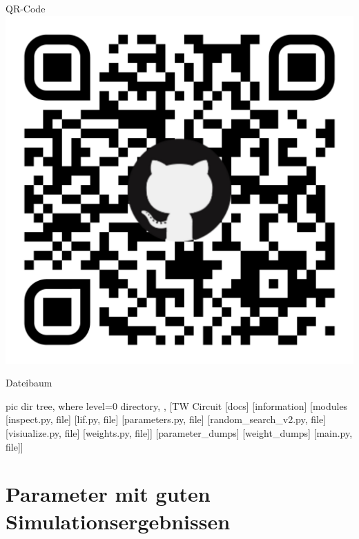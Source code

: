 \begin{minipage}[b]{0.38\textwidth}
	\begin{mybox}{QR-Code}
		\includegraphics[width=\textwidth]{figures/appendix/qr-code.pdf}
	\end{mybox}
	\begin{mybox}{Dateibaum}
		\vspace{0.3cm}
		\begin{forest}
			pic dir tree,
			where level=0{}{%
				directory,
			},
			[TW Circuit
			[docs]
			[information]
			[modules
			[inspect.py, file]
			[lif.py, file]
			[parameters.py, file]
			[random\_search\_v2.py, file]
			[visiualize.py, file]
			[weights.py, file]]
			[parameter\_dumps]
			[weight\_dumps]
			[main.py, file]]
		\end{forest}
	\end{mybox}
\end{minipage}


%
\chapter{Parameter mit guten Simulationsergebnissen}
%
\label{app:parameter}

